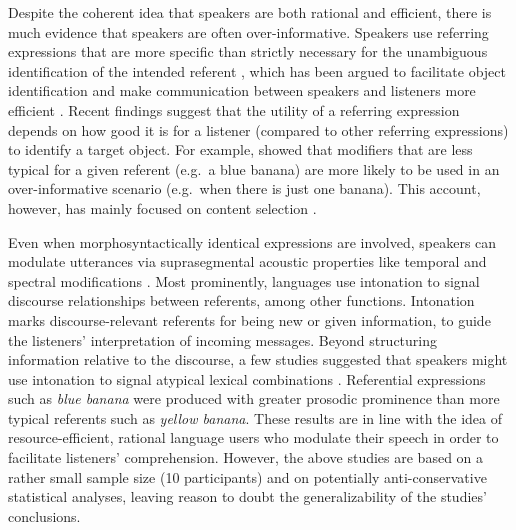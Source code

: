 \documentclass[Review,times,sageh]{sagej}
\begin{document}
Despite the coherent idea that speakers are both rational and efficient,
there is much evidence that speakers are often over-informative.
Speakers use referring expressions that are more specific than strictly
necessary for the unambiguous identification of the intended referent
\citep{sedivy2003pragmatic, westerbeek2015stored, rubio2016redundant},
which has been argued to facilitate object identification and make
communication between speakers and listeners more efficient
\citep{arts2011overspecification, paraboni2007generating, rubio2016redundant}.
Recent findings suggest that the utility of a referring expression
depends on how good it is for a listener (compared to other referring
expressions) to identify a target object. For example,
\citet{degen2020redundancy} showed that modifiers that are less typical
for a given referent (e.g.~a blue banana) are more likely to be used in
an over-informative scenario (e.g.~when there is just one banana). This
account, however, has mainly focused on content selection
\citep{gatt2013we}.

Even when morphosyntactically identical expressions are involved,
speakers can modulate utterances via suprasegmental acoustic properties
like temporal and spectral modifications
\citep[e.g.,][]{ladd2008intonational}. Most prominently, languages use
intonation to signal discourse relationships between referents, among
other functions. Intonation marks discourse-relevant referents for being
new or given information, to guide the listeners' interpretation of
incoming messages. Beyond structuring information relative to the
discourse, a few studies suggested that speakers might use intonation to
signal atypical lexical combinations
\citep[e.g.][]{dimitrova2008prosodic, dimitrova2009did}. Referential
expressions such as \emph{blue banana} were produced with greater
prosodic prominence than more typical referents such as \emph{yellow
banana}. These results are in line with the idea of resource-efficient,
rational language users who modulate their speech in order to facilitate
listeners' comprehension. However, the above studies are based on a
rather small sample size (10 participants) and on potentially
anti-conservative statistical analyses, leaving reason to doubt the
generalizability of the studies' conclusions.
\end{document}

